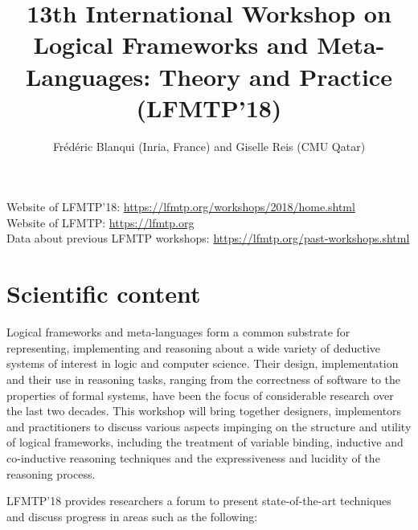\documentclass{article}
\begin{document}
\title{\bf 13th International Workshop on Logical
       Frameworks and Meta-Languages: Theory and Practice (LFMTP'18)}

\author{Fr\'ed\'eric Blanqui (Inria, France) and Giselle Reis (CMU Qatar)}

\date{}

\maketitle

Website of LFMTP'18: \url{https://lfmtp.org/workshops/2018/home.shtml}\\

Website of LFMTP: \url{https://lfmtp.org}\\

Data about previous LFMTP workshops: \url{https://lfmtp.org/past-workshops.shtml}

\section{Scientific content}

Logical frameworks and meta-languages form a common substrate for
representing, implementing and reasoning about a wide variety of
deductive systems of interest in logic and computer science. Their
design, implementation and their use in reasoning tasks, ranging from
the correctness of software to the properties of formal systems, have
been the focus of considerable research over the last two
decades. This workshop will bring together designers, implementors and
practitioners to discuss various aspects impinging on the structure
and utility of logical frameworks, including the treatment of variable
binding, inductive and co-inductive reasoning techniques and the
expressiveness and lucidity of the reasoning process.

LFMTP'18 provides researchers a forum to present
state-of-the-art techniques and discuss progress in areas such as the
following:
\end{document}
